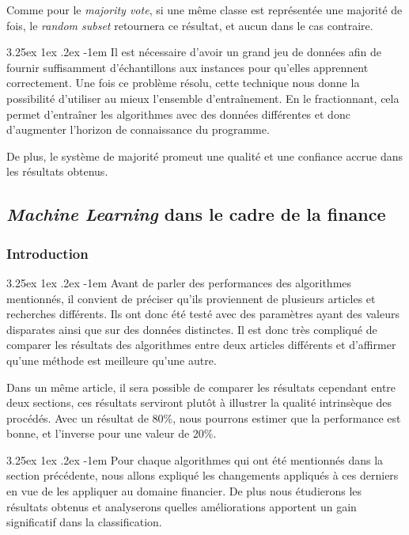 \documentclass[a4paper, 11pt]{article}
\makeatletter
\renewcommand\paragraph{\@startsection{paragraph}{5}{\z@}%
  {3.25ex \@plus1ex \@minus.2ex}%
  {-1em}%
  {\normalfont\normalsize\bfseries}}
\makeatother
\begin{document}
Comme pour le \textit{majority vote}, si une même classe est représentée une majorité de fois, le \textit{random subset} retournera ce résultat, et aucun dans le cas contraire.

\paragraph{}
Il est nécessaire d'avoir un grand jeu de données afin de fournir suffisamment d'échantillons aux instances pour qu'elles apprennent correctement.
Une fois ce problème résolu, cette technique nous donne la possibilité d'utiliser au mieux l'ensemble d'entraînement. En le fractionnant, cela permet d'entraîner les algorithmes avec des données différentes et donc d'augmenter l'horizon de connaissance du programme.

De plus, le système de majorité promeut une qualité et une confiance accrue dans les résultats obtenus.


\subsection{\textit{Machine Learning} dans le cadre de la finance}
\subsubsection{Introduction}
\paragraph{}
Avant de parler des performances des algorithmes mentionnés, il convient de préciser qu'ils proviennent de plusieurs articles et recherches différents. Ils ont donc été testé avec des paramètres ayant des valeurs disparates ainsi que sur des données distinctes.
Il est donc très compliqué de comparer les résultats des algorithmes entre deux articles différents et d'affirmer qu'une méthode est meilleure qu'une autre. 

Dans un même article, il sera possible de comparer les résultats cependant entre deux sections, ces résultats serviront plutôt à illustrer la qualité intrinsèque des procédés. Avec un résultat de 80\%, nous pourrons estimer que la performance est bonne, et l'inverse pour une valeur de 20\%.

\paragraph{}
Pour chaque algorithmes qui ont été mentionnés dans la section précédente, nous allons expliqué les changements appliqués à ces derniers en vue de les appliquer au domaine financier. De plus nous étudierons les résultats obtenus et analyserons quelles améliorations apportent un gain significatif dans la classification.
\end{document}
